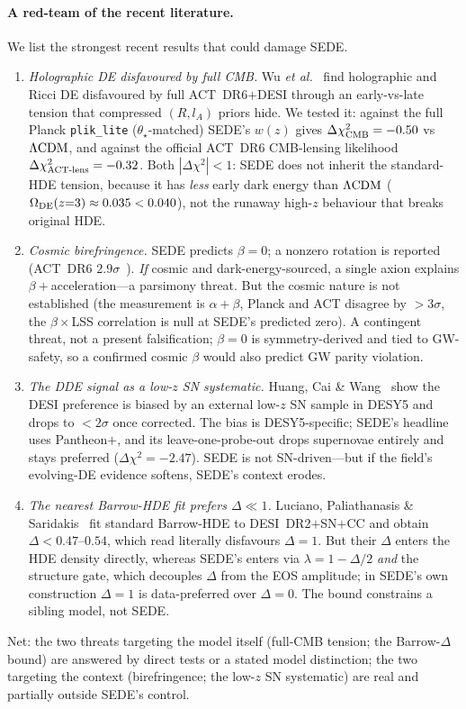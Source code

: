 \paragraph{A red-team of the recent literature.} We list the strongest recent results that could damage
SEDE.
\begin{enumerate}
\item \emph{Holographic DE disfavoured by full CMB.} Wu \textit{et al.}~\cite{Wu:2025vfs} find
holographic and Ricci DE disfavoured by full ACT~DR6$+$DESI through an early-vs-late tension that
compressed $(R,l_A)$ priors hide. We tested it: against the full Planck \texttt{plik\_lite}
($\theta_\star$-matched) SEDE's $w(z)$ gives $\Delta\chi^2_{\rm CMB}=-0.50$ vs $\Lambda\mathrm{CDM}$, and against the
official ACT~DR6 CMB-lensing likelihood $\Delta\chi^2_{\rm ACT\text{-}lens}=-0.32$. Both
$|\Delta\chi^2|<1$: SEDE does not inherit the standard-HDE tension, because it has \emph{less} early
dark energy than $\Lambda\mathrm{CDM}$ ($\Omega_{\rm DE}(z{=}3)\approx0.035<0.040$), not the runaway high-$z$
behaviour that breaks original HDE.
\item \emph{Cosmic birefringence.} SEDE predicts $\beta=0$; a nonzero rotation is reported (ACT~DR6
$2.9\sigma$~\cite{Eskilt:2022cff}). \emph{If} cosmic and dark-energy-sourced, a single axion explains
$\beta+$acceleration---a parsimony threat. But the cosmic nature is not established (the measurement is
$\alpha+\beta$, Planck and ACT disagree by ${>}3\sigma$, the $\beta\times$LSS correlation is null at
SEDE's predicted zero). A contingent threat, not a present falsification; $\beta=0$ is symmetry-derived
and tied to GW-safety, so a confirmed cosmic $\beta$ would also predict GW parity violation.
\item \emph{The DDE signal as a low-$z$ SN systematic.} Huang, Cai \& Wang~\cite{Huang:2025som} show the
DESI preference is biased by an external low-$z$ SN sample in DESY5 and drops to ${<}2\sigma$ once
corrected. The bias is DESY5-specific; SEDE's headline uses Pantheon$+$, and its leave-one-probe-out
drops supernovae entirely and stays preferred ($\Delta\chi^2=-2.47$). SEDE is not SN-driven---but if the
field's evolving-DE evidence softens, SEDE's context erodes.
\item \emph{The nearest Barrow-HDE fit prefers $\Delta\ll1$.} Luciano, Paliathanasis \&
Saridakis~\cite{Luciano:2025elo} fit standard Barrow-HDE to DESI~DR2$+$SN$+$CC and obtain
$\Delta<0.47$--$0.54$, which read literally disfavours $\Delta=1$. But their $\Delta$ enters the HDE
density directly, whereas SEDE's enters via $\lambda=1-\Delta/2$ \emph{and} the structure gate, which
decouples $\Delta$ from the EOS amplitude; in SEDE's own construction $\Delta=1$ is data-preferred over
$\Delta=0$. The bound constrains a sibling model, not SEDE.
\end{enumerate}
Net: the two threats targeting the model itself (full-CMB tension; the Barrow-$\Delta$ bound) are
answered by direct tests or a stated model distinction; the two targeting the context (birefringence;
the low-$z$ SN systematic) are real and partially outside SEDE's control.


